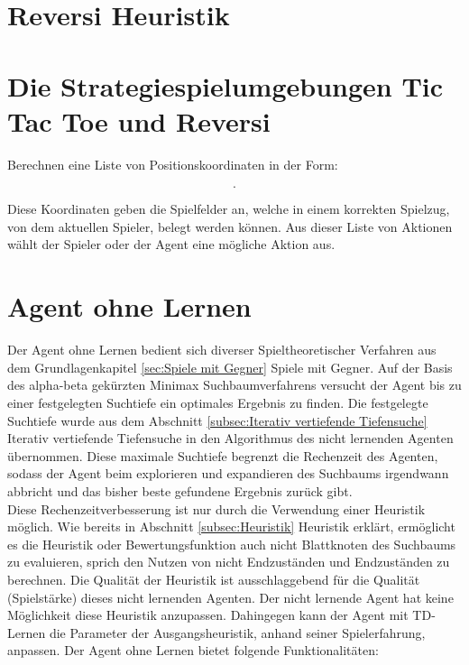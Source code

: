 \section{Reversi Heuristik}
\label{sec:Reversi Heuristik}

\section{Die Strategiespielumgebungen Tic Tac Toe und Reversi}

Berechnen eine Liste von Positionskoordinaten in der Form: 

\begin{equation*}
[Tupel(X_a Koordinate, Y_b Koordinate), ...].
\end{equation*}

Diese Koordinaten geben die Spielfelder an, welche in einem korrekten Spielzug, von dem aktuellen Spieler, belegt werden können. Aus dieser Liste von Aktionen wählt der Spieler oder der Agent eine mögliche Aktion aus.\\

\section{Agent ohne Lernen}
Der Agent ohne Lernen bedient sich diverser Spieltheoretischer Verfahren aus dem Grundlagenkapitel \ref{sec:Spiele mit Gegner} Spiele mit Gegner. Auf der Basis des alpha-beta gekürzten Minimax Suchbaumverfahrens versucht der Agent bis zu einer festgelegten Suchtiefe ein optimales Ergebnis zu finden. Die festgelegte Suchtiefe wurde aus dem Abschnitt \ref{subsec:Iterativ vertiefende Tiefensuche} Iterativ vertiefende Tiefensuche in den Algorithmus des nicht lernenden Agenten übernommen. Diese maximale Suchtiefe begrenzt die Rechenzeit des Agenten, sodass der Agent beim explorieren und expandieren des Suchbaums irgendwann abbricht und das bisher beste gefundene Ergebnis zurück gibt. \\

Diese Rechenzeitverbesserung ist nur durch die Verwendung einer Heuristik möglich. Wie bereits in Abschnitt \ref{subsec:Heuristik} Heuristik erklärt, ermöglicht es die Heuristik oder Bewertungsfunktion auch nicht Blattknoten des Suchbaums zu evaluieren, sprich den Nutzen von nicht Endzuständen und Endzuständen zu berechnen. Die Qualität der Heuristik ist ausschlaggebend für die Qualität (Spielstärke) dieses nicht lernenden Agenten. Der nicht lernende Agent hat keine Möglichkeit diese Heuristik anzupassen. Dahingegen kann der Agent mit TD-Lernen die Parameter der Ausgangsheuristik, anhand seiner Spielerfahrung, anpassen. Der Agent ohne Lernen bietet folgende Funktionalitäten:

